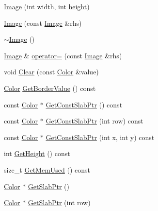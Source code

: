 \begin{DoxyCompactItemize}
\hyperlink{classnoise_1_1utils_1_1_image_ab30944ce3d44c477ba19f32a07318e0a}{Image} (int width, int \hyperlink{_examples_2_bezier_2_app_8cpp_a48083b65ac9a863566dc3e3fff09a5b4}{height})
\item 
\hyperlink{classnoise_1_1utils_1_1_image_a8fade555e1cfe4d8c54799bde5ba5d41}{Image} (const \hyperlink{classnoise_1_1utils_1_1_image}{Image} \&rhs)
\item 
\hyperlink{classnoise_1_1utils_1_1_image_af7dde0cd222c8da162db0266360979b3}{$\sim$\+Image} ()
\item 
\hyperlink{classnoise_1_1utils_1_1_image}{Image} \& \hyperlink{classnoise_1_1utils_1_1_image_a72924742b20cd625ba12793317fdb22a}{operator=} (const \hyperlink{classnoise_1_1utils_1_1_image}{Image} \&rhs)
\item 
void \hyperlink{classnoise_1_1utils_1_1_image_a11e5e0cc9576cd90ebe2a8df22b925f6}{Clear} (const \hyperlink{classnoise_1_1utils_1_1_color}{Color} \&value)
\item 
\hyperlink{classnoise_1_1utils_1_1_color}{Color} \hyperlink{classnoise_1_1utils_1_1_image_aaa506f72d9198c6b3c861b6222c5749c}{Get\+Border\+Value} () const 
\item 
const \hyperlink{classnoise_1_1utils_1_1_color}{Color} $\ast$ \hyperlink{classnoise_1_1utils_1_1_image_a80bbbdb0b01de1bd96758ef778d9dd1c}{Get\+Const\+Slab\+Ptr} () const 
\item 
const \hyperlink{classnoise_1_1utils_1_1_color}{Color} $\ast$ \hyperlink{classnoise_1_1utils_1_1_image_a9e999f71f14c9a7ddf216b113b314160}{Get\+Const\+Slab\+Ptr} (int row) const 
\item 
const \hyperlink{classnoise_1_1utils_1_1_color}{Color} $\ast$ \hyperlink{classnoise_1_1utils_1_1_image_aa9ec64c116a3266fd69191fe311bf90e}{Get\+Const\+Slab\+Ptr} (int x, int y) const 
\item 
int \hyperlink{classnoise_1_1utils_1_1_image_aded188470833c4f5ff321fb11c973b1e}{Get\+Height} () const 
\item 
size\+\_\+t \hyperlink{classnoise_1_1utils_1_1_image_a713dc911656d7b3e0fffd4ed00c674a7}{Get\+Mem\+Used} () const 
\item 
\hyperlink{classnoise_1_1utils_1_1_color}{Color} $\ast$ \hyperlink{classnoise_1_1utils_1_1_image_a4349e07bc8d153d64c0a21a0e1062701}{Get\+Slab\+Ptr} ()
\item 
\hyperlink{classnoise_1_1utils_1_1_color}{Color} $\ast$ \hyperlink{classnoise_1_1utils_1_1_image_a5e81973f78d9bec8f79dfc63f0e15b4d}{Get\+Slab\+Ptr} (int row)
\item 

\end{DoxyCompactItemize}
